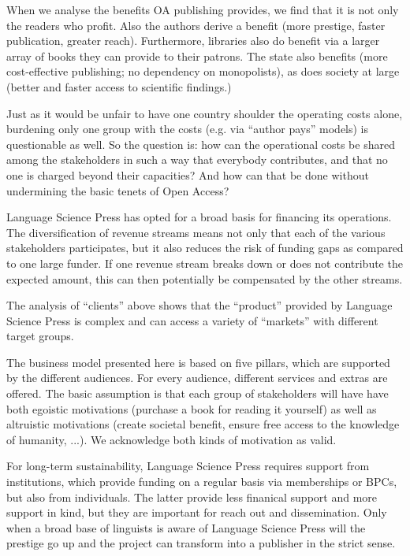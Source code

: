 \documentclass[output=guidelines,nonflat,smallfont,
draftmode
]{langsci/langscibook}
\begin{document}
{When we analyse the benefits OA publishing provides, we find that it is not only the readers who profit. Also the authors derive a benefit (more prestige, faster publication, greater reach). Furthermore, libraries also do benefit via a larger array of books they can provide to their patrons. The state also benefits (more cost-effective publishing; no dependency on monopolists), as does society at large (better and faster access to scientific findings.) 

Just as it would be unfair to have one country shoulder the operating costs alone, burdening only one group with the costs (e.g. via ``author pays'' models) is questionable as well. So the question is: how can the operational costs be shared among the stakeholders in such a way that everybody contributes, and that no one is charged beyond their capacities? And how can that be done without undermining the basic tenets of Open Access?

Language Science Press has opted for a broad basis for financing its operations. The diversification of revenue streams means not only that each of the various stakeholders participates, but it also reduces the risk of funding gaps as compared to one large funder. If one revenue stream breaks down or does not contribute the expected amount, this can then potentially be compensated by the other streams. 

The analysis of ``clients'' above shows that the ``product'' provided by Language Science Press is complex and can access a variety of ``markets'' with different target groups. 
 
The business model presented here is based on five pillars, which are supported by the different audiences. For every audience, different services and extras are offered. The basic assumption is that each group of stakeholders will have have both egoistic motivations (purchase a book for reading it yourself) as well as altruistic motivations (create societal benefit, ensure free access to the knowledge of humanity, ...).  We acknowledge both kinds of motivation as valid. 

For long-term sustainability, Language Science Press requires support from institutions, which provide funding on a regular basis via memberships or BPCs, but also from individuals. The latter provide less finanical support and more support in kind, but they are important for reach out and dissemination. Only when a broad base of linguists is aware of Language Science Press will the prestige go up and the project can transform into a publisher in the strict sense. 

}
\end{document}
